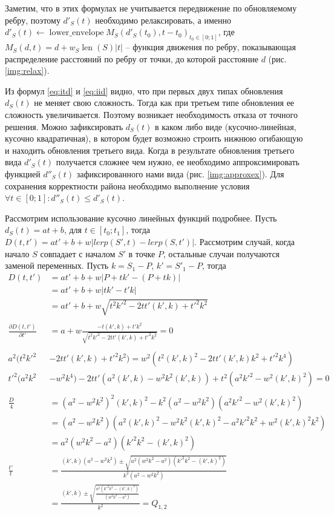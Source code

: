 Заметим, что в этих формулах не учитывается передвижение
по обновляемому ребру, поэтому $d'_S(t)$ необходимо релаксировать, а
именно $d'_S(t) \gets \mathop{lower\_envelope}{M_S(d'_S(t_0), t - t_0)}_{t_0 \in [0; 1]}$,
где $M_S(d, t) = d + w_S\mathop{len}(S)|t|$ -- функция движения по ребру,
показывающая распределение расстояний по ребру от точки, до которой
расстояние $d$ (рис. \ref{img:relax}).


Из формул \ref{eq:itd} и \ref{eq:iid} видно, что при первых двух типах
обновления $d_S(t)$ не меняет свою сложность. Тогда как при третьем
типе обновления ее сложность увеличивается. Поэтому возникает
необходимость отказа от точного решения. Можно зафиксировать
$d_S(t)$ в каком либо виде (кусочно-линейная, кусочно квадратичная),
в котором будет возможно строить нижнюю огибающую и находить обновления
третьего вида. Когда в результате обновления третьего вида $d'_S(t)$
получается сложнее чем нужно, ее необходимо аппроксимировать функцией
$d''_S(t)$ зафиксированного нами вида (рис. \ref{img:approxex}).
Для сохранения корректности района
необходимо выполнение условия $\forall t \in [0; 1]: d''_S(t) \leq d'_S(t)$.


Рассмотрим использование кусочно линейных функций подробнее.
Пусть $d_S(t) = at + b$, для $t \in [t_0; t_1]$, тогда
$D(t, t') = at' + b + w|lerp(S', t) - lerp(S, t')|$.
Рассмотрим случай, когда начало $S$ совпадает с началом $S'$ в точке $P$,
остальные случаи получаются заменой переменных.
Пусть $k = S_1 - P$, $k' = S'_1 - P$, тогда
\[
\begin{aligned}
D(t, t') &= at' + b + w|P + tk' - (P + tk)| \\
&= at' + b + w|tk' - t'k| \\
&= at' + b + w\sqrt{t^2k'^2 - 2tt'(k', k) + t'^2k^2} \\
\\
\frac{\partial D(t, t')}{\partial t'} &= a + w\frac{-t(k', k) + t'k^2}
{\sqrt{t^2k'^2 - 2tt'(k', k) + t'^2k^2}} = 0\\
\\
a^2(t^2k'^2& - 2tt'(k', k) + t'^2k^2) = w^2(t^2(k', k)^2 - 2tt'(k', k)k^2 + t'^2k^4) \\
t'^2(a^2k^2& - w^2k^4) - 2tt'(a^2(k', k) - w^2k^2(k', k)) + t^2(a^2k'^2 - w^2(k', k)^2) = 0\\
\\
\frac{D}{4} &= (a^2 - w^2k^2)^2(k', k)^2 - k^2(a^2 - w^2k^2)(a^2k'^2 - w^2(k', k)^2)\\
&= (a^2 - w^2k^2)(a^2(k', k)^2 - w^2k^2(k', k)^2 - a^2k'^2k^2 + w^2(k', k)^2k^2)\\
&= a^2(w^2k^2 - a^2)(k'^2k^2 - (k', k)^2)\\
\frac{t'}{t} &= \frac{(k', k)(a^2 - w^2k^2) \pm \sqrt{a^2(w^2k^2 - a^2)(k'^2k^2 - (k', k)^2)}}
{k^2(a^2 - w^2k^2)}\\
&= \frac{(k', k) \pm \sqrt{\frac{a^2(k'^2k^2 - (k', k)^2)}{(w^2k^2 - a^2)}}}{k^2} = Q_{1,2}\\
\end{aligned}
\]

